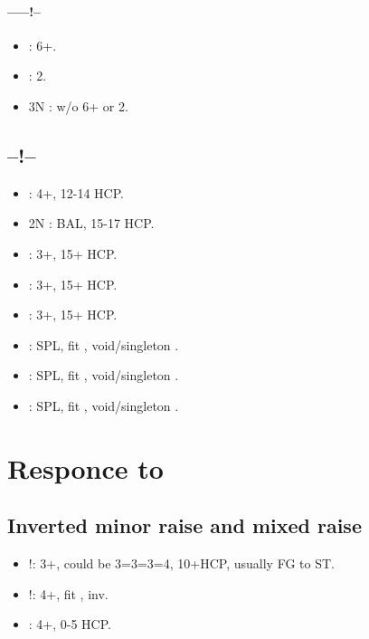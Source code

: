 \documentclass[12pt,twoside,a5paper]{report}%
\begin{document}
			\subsubsection*{------!--}
			\begin{itemize}
			\renewcommand{\labelitemi}{}
			\item {} : 6+\cl{}.
			\item {} : 2\di{}.
			\item 3N : w/o  6+\cl{} or 2\di{}.
			\end{itemize}
	
	\section*{--!--}
		\begin{itemize}
		\renewcommand{\labelitemi}{}
		\item {} : 4+\cl{}, 12-14 HCP.
		\item 2N : BAL, 15-17 HCP.
		\item {} : 3+\di{}, 15+ HCP.
		\item {} : 3+\he{}, 15+ HCP.
		\item {} : 3+\sp{}, 15+ HCP.
		\item {} : SPL, fit \cl{}, void/singleton \di{}.
		\item {} : SPL, fit \cl{}, void/singleton \he{}.
		\item {} : SPL, fit \cl{}, void/singleton \sp{}.
		\end{itemize}
	

\chapter*{Responce to }

	\section*{Inverted minor raise and mixed raise}
		\begin{itemize}
		\renewcommand{\labelitemi}{}
		\item {}!: 3+\di{}, could be 3=3=3=4, 10+HCP, usually FG to ST. 
		\item {}!: 4+\di{}, fit \di{}, inv.  
		\item {} : 4+\di{}, 0-5 HCP. 
		\end{itemize}
\end{document}
